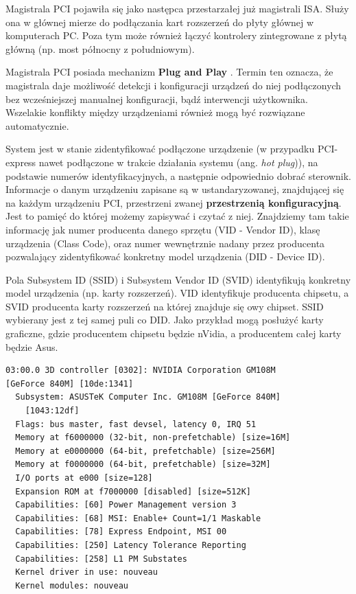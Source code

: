 \documentclass[shortabstract,inz]{iithesis}
\begin{document}
Magistrala PCI pojawiła się jako następca
przestarzałej już magistrali ISA.  Służy ona w głównej mierze do
podłączania kart rozszerzeń do płyty głównej w komputerach PC. Poza tym 
może również łączyć kontrolery zintegrowane z płytą główną (np. most północny z
południowym).

Magistrala PCI posiada mechanizm \textbf{Plug and Play} \label{def:plug_and_play}\cite{def:wiki_plug_play}. 
Termin ten oznacza, że magistrala
daje możliwość detekcji i konfiguracji urządzeń do niej podłączonych bez wcześniejszej 
manualnej konfiguracji, bądź interwencji użytkownika. Wszelakie konflikty między 
urządzeniami również mogą być rozwiązane automatycznie.

System jest w stanie zidentyfikować podłączone urządzenie (w przypadku
PCI-express nawet podłączone w trakcie działania systemu
(ang. \textit{hot plug})), na podstawie numerów identyfikacyjnych, a
następnie odpowiednio dobrać sterownik.  Informacje o danym urządzeniu
zapisane są w ustandaryzowanej, znajdującej się na każdym urządzeniu PCI, przestrzeni 
zwanej \textbf{przestrzenią konfiguracyjną}. Jest to pamięć do której możemy zapisywać i czytać z niej.
Znajdziemy tam takie informację jak numer
producenta danego sprzętu (VID - Vendor ID), klasę urządzenia (Class
Code), oraz numer wewnętrznie nadany przez producenta pozwalający
zidentyfikować konkretny model urządzenia (DID - Device ID).

Pola Subsystem ID (SSID) i Subsystem Vendor ID (SVID) identyfikują konkretny model
urządzenia (np. karty rozszerzeń). VID identyfikuje producenta chipsetu, a SVID
producenta karty rozszerzeń na której znajduje się owy chipset. 
SSID wybierany jest z tej samej puli co DID. Jako przykład mogą posłużyć karty graficzne,
gdzie producentem chipsetu będzie nVidia, a producentem całej karty będzie Asus.

\begin{lstlisting}[caption={Część wydruku komendy lspci -v -nn \protect\footnotemark},label={lspci2}]
03:00.0 3D controller [0302]: NVIDIA Corporation GM108M 
[GeForce 840M] [10de:1341]
  Subsystem: ASUSTeK Computer Inc. GM108M [GeForce 840M] 
    [1043:12df]
  Flags: bus master, fast devsel, latency 0, IRQ 51
  Memory at f6000000 (32-bit, non-prefetchable) [size=16M]
  Memory at e0000000 (64-bit, prefetchable) [size=256M]
  Memory at f0000000 (64-bit, prefetchable) [size=32M]
  I/O ports at e000 [size=128]
  Expansion ROM at f7000000 [disabled] [size=512K]
  Capabilities: [60] Power Management version 3
  Capabilities: [68] MSI: Enable+ Count=1/1 Maskable
  Capabilities: [78] Express Endpoint, MSI 00
  Capabilities: [250] Latency Tolerance Reporting
  Capabilities: [258] L1 PM Substates
  Kernel driver in use: nouveau
  Kernel modules: nouveau
\end{lstlisting}
\end{document}
